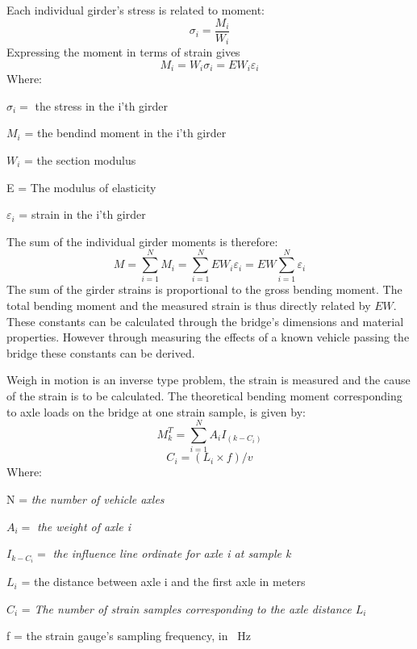 Each individual girder's stress is related to moment:
\begin{equation}
\sigma_{i} = \frac{M_i}{W_i}
\end{equation}
Expressing the moment in terms of strain gives
\begin{equation}
M_{i} = W_{i} \sigma_{i} = E W_{i}  \varepsilon_{i}
\end{equation}
Where:
\begin{description}
	\item $\sigma_{i} = $ the stress in the i'th girder
	\item $ M_i $ = the bendind moment in the i'th girder
	\item $ W_i $ = the section modulus
\end{description}
\begin{description}
	\item E =  The modulus of elasticity
	\item $ \varepsilon_i $ = strain in the i'th girder
\end{description}
The sum of the individual girder moments is therefore:
\begin{equation}
M = \sum_{i = 1}^{N} M_i = \sum_{i = 1}^{N} EW_i \varepsilon_i = EW \sum_{i = 1}^{N} \varepsilon_i
\label{equation:moment_strain}
\end{equation}
The sum of the girder strains is proportional to the gross bending moment. The total bending moment and the measured strain is thus directly related by $EW$. These constants can be calculated through the bridge's dimensions and material properties. However through measuring the effects of a known vehicle passing the bridge these constants can be derived.

Weigh in motion is an inverse type problem, the strain is measured and the cause of the strain is to be calculated. The theoretical bending moment corresponding to axle loads on the bridge at one strain sample, is given by:
\begin{equation}
M_k^T = \sum_{i = 1}^{N} A_i I_{(k-C_i)}
\label{equation:theoretical_strain}
\end{equation}
\begin{equation}
C_i = (L_i \times f)/v
\end{equation}
Where:
\begin{description}
	\item N = \textit{the number of vehicle axles}
	\item $A_i = $ \textit{the weight of axle i}
	\item $I_{k-C_i} = $ \textit{the influence line ordinate for axle i at sample k}
	\item $L_i$ = the distance between axle i and the first axle in meters
	\item $C_i$  = \textit{The number of strain samples corresponding to the axle distance $L_i$}
	\item f = the strain gauge's sampling frequency, in \SI{}{\Hz}
\end{description}


